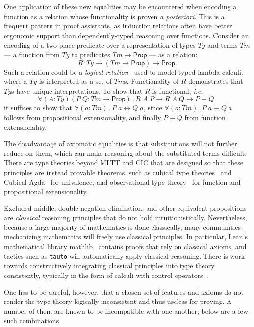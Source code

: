 \documentclass{article}
\makeatletter
\newcommand{\ie}{\textit{i.e.}\@\xspace}
\newcommand{\apost}{\textit{a posteriori}\@\xspace}
\newcommand{\kw}[1]{\mathsf{#1}}
\newcommand{\code}[1]{\texttt{#1}}
\makeatother
\begin{document}
One application of these new equalities
may be encountered when encoding a function as a relation
whose functionality is proven \apost.
This is a frequent pattern in proof assistants,
as induction relations often have better ergonomic support
than dependently-typed reasoning over functions.
Consider an encoding of a two-place predicate
over a representation of types $\mathit{Ty}$ and terms $\mathit{Tm}$ ---
a function from $\mathit{Ty}$ to predicates $\mathit{Tm} \to \kw{Prop}$ ---
as a relation:
$$R : \mathit{Ty} \to (\mathit{Tm} \to \kw{Prop}) \to \kw{Prop}.$$
Such a relation could be a \emph{logical relation}~\citep{logrel}
used to model typed lambda calculi,
where a $\mathit{Ty}$ is interpreted as a set of $\mathit{Tm}$s.
Functionality of $R$ demonstrates that $\mathit{Ty}$s have unique interpretations.
To show that $R$ is functional, \ie
$$\forall (A : \mathit{Ty}) (P \; Q : \mathit{Tm} \to \kw{Prop}) \mathpunct{.}
  R \; A \; P \to R \; A \; Q \to P \equiv Q,$$
it suffices to show that
$\forall (a : \mathit{Tm})\mathpunct{.} P \; a \leftrightarrow Q \; a$,
since $\forall (a : \mathit{Tm})\mathpunct{.} P \; a \equiv Q \; a$
follows from propositional extensionality,
and finally $P \equiv Q$ from function extensionality.

The disadvantage of axiomatic equalities is that substitutions will not further reduce on them,
which can make reasoning about the substituted terms difficult.
There are type theories beyond MLTT and CIC that are designed
so that these principles are instead provable theorems,
such as cubical type theories~\citep{bch,cchm,afh,cartesian}
and Cubical Agda~\citep{cubical-agda} for univalence,
and observational type theory~\citep{ott,ott-now,ttobs,ccobs,cicobs}
for function and propositional extensionality.

Excluded middle, double negation elimination,
and other equivalent propositions are \emph{classical} reasoning principles
that do not hold intuitionistically.
Nevertheless, because a large majority of mathematics is done classically,
many communities mechanizing mathematics will freely use classical principles.
In particular, Lean's mathematical library mathlib~\citep{mathlib}
contains proofs that rely on classical axioms,
and tactics such as \code{tauto} will automatically apply classical reasoning.
There is work towards constructively integrating classical principles into type theory consistently,
typically in the form of calculi with control operators~\citep{mu,mumu,dl,sr}.

One has to be careful, however, that a chosen set of features and axioms
do not render the type theory logically inconsistent and thus useless for proving.
A number of them are known to be incompatible with one another;
below are a few such combinations.
\end{document}
